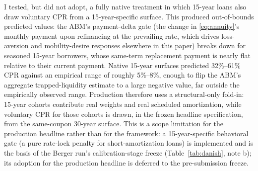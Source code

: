 \documentclass[12pt]{article}
\begin{document}
I tested, but did not adopt, a fully native treatment in which 15-year loans also draw voluntary CPR from a 15-year-specific surface. This produced out-of-bounds predicted values: the ABM's payment-delta gate (the change in \eqref{eq:annuity}'s monthly payment upon refinancing at the prevailing rate, which drives loss-aversion and mobility-desire responses elsewhere in this paper) breaks down for seasoned 15-year borrowers, whose same-term replacement payment is nearly flat relative to their current payment. Native 15-year surfaces predicted 32\%--61\% CPR against an empirical range of roughly 5\%--8\%, enough to flip the ABM's aggregate trapped-liquidity estimate to a large negative value, far outside the empirically observed range. Production therefore uses a structural-only fold-in: 15-year cohorts contribute real weights and real scheduled amortization, while voluntary CPR for those cohorts is drawn, in the frozen headline specification, from the same-coupon 30-year surface. This is a scope limitation for the production headline rather than for the framework: a 15-year-specific behavioral gate (a pure rate-lock penalty for short-amortization loans) is implemented and is the basis of the Berger run's calibration-stage freeze (Table~\ref{tab:danish}, note b); its adoption for the production headline is deferred to the pre-submission freeze.
\end{document}
